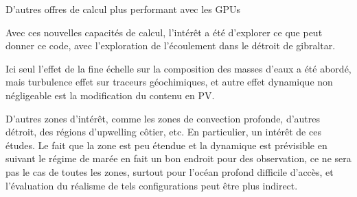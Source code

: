 D'autres offres de calcul plus performant avec les GPUs

Avec ces nouvelles capacités de calcul, l'intérêt a été d'explorer ce que peut donner ce code, avec l'exploration de l'écoulement dans le détroit de gibraltar. 


Ici seul l'effet de la fine échelle sur la composition des masses d'eaux a été abordé, mais turbulence effet sur traceurs géochimiques, et autre effet dynamique non négligeable est la modification du contenu en PV.


D'autres zones d'intérêt, comme les zones de convection profonde, d'autres détroit, des régions d'upwelling côtier, etc. En particulier, un intérêt de ces études. Le fait que la zone est peu étendue et la dynamique est prévisible en suivant le régime de marée en fait un bon endroit pour des observation, ce ne sera pas le cas de toutes les zones, surtout pour l'océan profond difficile d'accès, et l'évaluation du réalisme de tels configurations peut être plus indirect.

